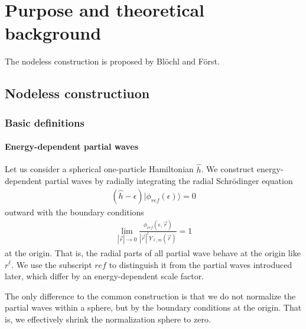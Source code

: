 \documentclass[11pt,a4paper]{report}
\begin{document}
\chapter{Purpose and theoretical background}
The nodeless construction is proposed by Bl\"ochl and
F\"orst\cite{bloechl12_arxiv1210_5937}.

\section{Nodeless constructiuon}
\subsection{Basic definitions}
\subsubsection{Energy-dependent partial waves}
Let us consider a spherical one-particle Hamiltonian $\hat{h}$. We
construct energy-dependent partial waves by radially integrating the
radial Schr\"odinger equation 
\begin{eqnarray}
(\hat{h}-\epsilon)|\phi_{ref}(\epsilon)\rangle=0
\end{eqnarray}
outward with the boundary
conditions 
\begin{eqnarray}
\lim_{|\vec{r}|\rightarrow0}\frac{\phi_{ref}(\epsilon,\vec{r})}
{|\vec{r}|^\ell Y_{\ell,m}(\vec{r})}=1
\end{eqnarray}
at the origin. That is, the radial parts of all partial wave behave at
the origin like $r^\ell$. We use the subscript $ref$ to distinguish it
from the partial waves introduced later, which differ by an
energy-dependent scale factor.

The only difference to the common construction is that we do not
normalize the partial waves within a sphere, but by the boundary
conditions at the origin. That is, we effectively shrink the
normalization sphere to zero.

\end{document}
